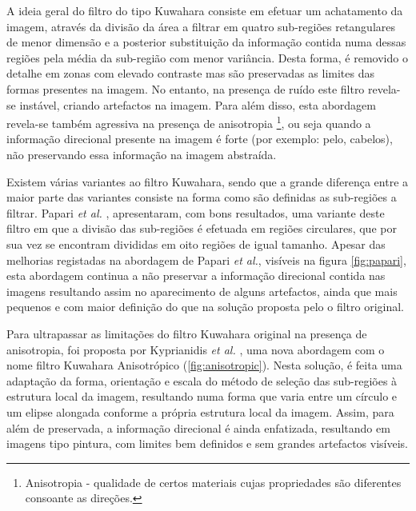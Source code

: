 A ideia geral do filtro do tipo Kuwahara consiste em efetuar um achatamento da imagem, através da divisão da área a filtrar em quatro sub-regiões retangulares de menor dimensão e a posterior substituição da informação contida numa dessas regiões pela média da sub-região com menor variância. Desta forma, é removido o detalhe em zonas com elevado contraste mas são preservadas as limites das formas presentes na imagem. No entanto, na presença de ruído este filtro revela-se instável, criando artefactos na imagem. Para além disso, esta abordagem revela-se também agressiva na presença de anisotropia \footnote{Anisotropia - qualidade de certos materiais cujas propriedades são diferentes consoante as direções.}, ou seja quando a informação direcional presente na imagem é forte (por exemplo: pelo, cabelos), não preservando essa informação na imagem abstraída.

Existem várias variantes ao filtro Kuwahara, sendo que a grande diferença entre a maior parte das variantes consiste na forma como são definidas as sub-regiões a filtrar. Papari \textit{et al.} \cite{Papari2007}, apresentaram, com bons resultados, uma variante deste filtro em que a divisão das sub-regiões é efetuada em regiões circulares, que por sua vez se encontram divididas em oito regiões de igual tamanho. Apesar das melhorias registadas na abordagem de Papari \textit{et al.}, visíveis na figura \ref{fig:papari}, esta abordagem continua a não preservar a informação direcional contida nas imagens resultando assim no aparecimento de alguns artefactos, ainda que mais pequenos e com maior definição do que na solução proposta pelo o filtro original.

Para ultrapassar as limitações do filtro Kuwahara original na presença de anisotropia, foi proposta por Kyprianidis \textit{et al.} \cite{Kyprianidis2009}, uma nova abordagem com o nome filtro Kuwahara Anisotrópico (\ref{fig:anisotropic}). Nesta solução, é feita uma adaptação da forma, orientação e escala do método de seleção das sub-regiões à estrutura local da imagem, resultando numa forma que varia entre um círculo e um elipse alongada conforme a própria estrutura local da imagem. Assim, para além de preservada, a informação direcional é ainda enfatizada, resultando em imagens tipo pintura, com limites bem definidos e sem grandes artefactos visíveis.

